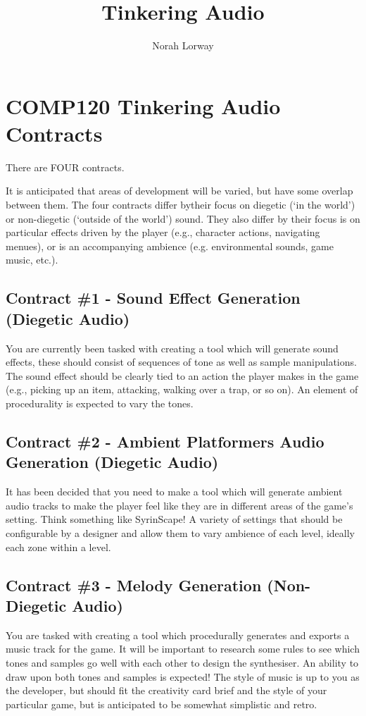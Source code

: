 \documentclass{../../fal_assignment}
\title{Tinkering Audio}
\author{Norah Lorway}
\begin{document}
\section*{COMP120 Tinkering Audio Contracts}

There are FOUR contracts.

It is anticipated that areas of development will be varied, but have some overlap between them. The four contracts differ bytheir focus on diegetic (`in the world') or non-diegetic (`outside of the world') sound. They also differ by their focus is on particular effects driven by the player (e.g., character actions, navigating menues), or is an accompanying ambience (e.g. environmental sounds, game music, etc.).

\subsection*{Contract \#1 - Sound Effect Generation (Diegetic Audio)}
You are currently been tasked with creating a tool which will generate sound effects, these should consist of sequences of tone as well as sample manipulations. The sound effect should be clearly tied to an action the player makes in the game (e.g., picking up an item, attacking, walking over a trap, or so on). An element of procedurality is expected to vary the tones.

\subsection*{Contract \#2 - Ambient Platformers Audio Generation (Diegetic Audio)}
It has been decided that you need to make a tool which will generate ambient audio tracks to make the player feel like they are in different areas of the game's setting. Think something like SyrinScape! A variety of settings that should be configurable by a designer and allow them to vary ambience of each level, ideally each zone within a level.

\subsection*{Contract \#3 - Melody Generation (Non-Diegetic Audio)}
You are tasked with creating a tool which procedurally generates and exports a music track for the game. It will be important to research some rules to see which tones and samples go well with each other to design the synthesiser. An ability to draw upon both tones and samples is expected! The style of music is up to you as the developer, but should fit the creativity card brief and the style of your particular game, but is anticipated to be somewhat simplistic and retro.
\end{document}
